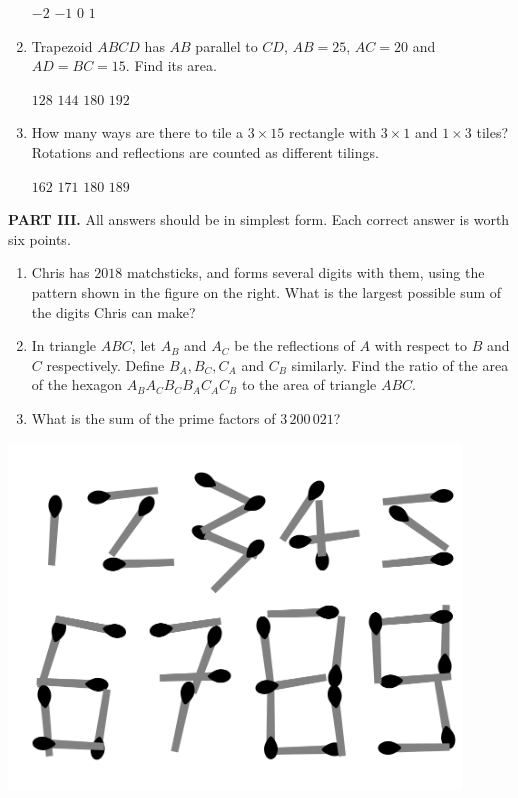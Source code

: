 \documentclass[11pt,paper=letter]{scrartcl}
\begin{document}
\begin{enumerate}[start=3]
  \fourch
  {$-2$}
  {$-1$}
  {$0$}
  {$1$}

  \item Trapezoid $ABCD$ has $AB$ parallel to $CD$, $AB = 25$, $AC = 20$ and $AD = BC = 15$. Find its area.

  \fourch
  {$128$}
  {$144$}
  {$180$}
  {$192$}

  \item How many ways are there to tile a $3 \times 15$ rectangle with $3 \times 1$ and $1 \times 3$ tiles? Rotations and reflections are counted as different tilings.

  \fourch
  {$162$}
  {$171$}
  {$180$}
  {$189$}
\end{enumerate}

\vspace{1em}
\noindent\textbf{PART III.} All answers should be in simplest form. Each correct answer is worth six points.
\vspace{1em}

\noindent
\begin{minipage}{0.65\textwidth}
  \begin{enumerate}
    \item Chris has $2018$ matchsticks, and forms several digits with them, using the pattern shown in the figure on the right. What is the largest possible sum of the digits Chris can make?

    \item In triangle $ABC$, let $A_B$ and $A_C$ be the reflections of $A$ with respect to $B$ and $C$ respectively. Define $B_A, B_C, C_A$ and $C_B$ similarly. Find the ratio of the area of the hexagon $A_BA_CB_CB_AC_AC_B$ to the area of triangle $ABC$.

    \item What is the sum of the prime factors of $3\,200\,021$?
  \end{enumerate}
\end{minipage}%
\begin{minipage}{0.35\textwidth}
  \begin{center}
    \includegraphics[width=0.9\textwidth]{f3.png}
  \end{center}
\end{minipage}
\end{document}
